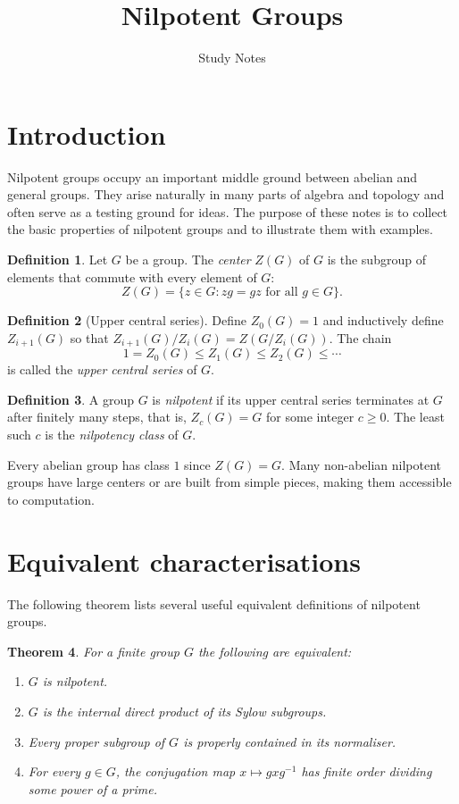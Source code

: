 \documentclass{article}
\title{Nilpotent Groups}
\author{Study Notes}
\date{}
\newtheorem{theorem}{Theorem}[section]
\theoremstyle{definition}
\newtheorem{definition}[theorem]{Definition}
\begin{document}
\maketitle
\tableofcontents

\section{Introduction}
Nilpotent groups occupy an important middle ground between abelian and general groups.  
They arise naturally in many parts of algebra and topology and often serve as a testing ground for ideas.  
The purpose of these notes is to collect the basic properties of nilpotent groups and to illustrate them with examples.

\begin{definition}
Let $G$ be a group.  The \emph{center} $Z(G)$ of $G$ is the subgroup of elements that commute with every element of $G$:
\[
Z(G)=\{ z\in G : zg=gz \text{ for all } g\in G\}.
\]
\end{definition}

\begin{definition}[Upper central series]
Define $Z_0(G)=1$ and inductively define $Z_{i+1}(G)$ so that $Z_{i+1}(G)/Z_i(G)=Z(G/Z_i(G))$.  
The chain
\[
1=Z_0(G)\le Z_1(G) \le Z_2(G) \le \cdots
\]
is called the \emph{upper central series} of $G$.
\end{definition}

\begin{definition}
A group $G$ is \emph{nilpotent} if its upper central series terminates at $G$ after finitely many steps, that is, $Z_c(G)=G$ for some integer $c\ge 0$.  The least such $c$ is the \emph{nilpotency class} of $G$.
\end{definition}

Every abelian group has class $1$ since $Z(G)=G$.  Many non-abelian nilpotent groups have large centers or are built from simple pieces, making them accessible to computation.

\section{Equivalent characterisations}
The following theorem lists several useful equivalent definitions of nilpotent groups.

\begin{theorem}\label{thm:equiv}
For a finite group $G$ the following are equivalent:
\begin{enumerate}
  \item $G$ is nilpotent.
  \item $G$ is the internal direct product of its Sylow subgroups.
  \item Every proper subgroup of $G$ is properly contained in its normaliser.
  \item For every $g\in G$, the conjugation map $x\mapsto gxg^{-1}$ has finite order dividing some power of a prime.
\end{enumerate}
\end{theorem}
\end{document}
